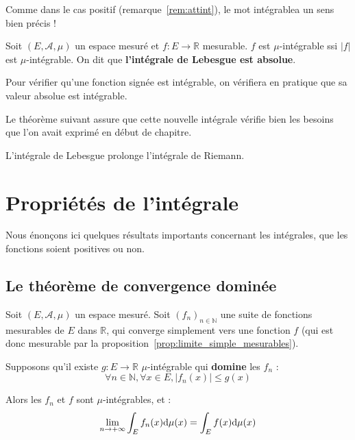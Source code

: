 \documentclass[../integ-proba.tex]{subfiles}
\begin{document}
  \begin{rem}
    Comme dans le cas positif (remarque~\ref{rem:attint}), le mot \og intégrable\fg a un sens bien précis !
  \end{rem}

  \begin{thm}
    Soit $\left(E, \mathcal{A}, \mu\right)$ un espace mesuré et $f:E\longrightarrow\mathbb{R}$ mesurable. $f$ est $\mu$-intégrable ssi $\left|f\right|$ est $\mu$-intégrable.
    On dit que \textbf{l'intégrale de Lebesgue est absolue}.
  \end{thm}

  \begin{rem}
    Pour vérifier qu'une fonction signée est intégrable, on vérifiera en pratique que sa valeur absolue est intégrable.
  \end{rem}

  Le théorème suivant assure que cette nouvelle intégrale vérifie bien les besoins que l'on avait exprimé en début de chapitre.

  \begin{thm}
    L'intégrale de Lebesgue prolonge l'intégrale de Riemann.
  \end{thm}

  \section{Propriétés de l'intégrale}

  Nous énonçons ici quelques résultats importants concernant les intégrales, que les fonctions soient positives ou non.

  \subsection{Le théorème de convergence dominée}

  \begin{thm}
    \label{thm:convergence_dominee}
    Soit $\left(E,\mathcal{A},\mu\right)$ un espace mesuré.
    Soit $\left(f_n\right)_{n \in \mathbb{N}}$ une suite de fonctions mesurables de $E$ dans $\mathbb{R}$, qui converge simplement vers une fonction $f$ (qui est donc mesurable par la proposition~\ref{prop:limite_simple_mesurables}).

    Supposons qu'il existe $g:E \longrightarrow \mathbb{R}$ $\mu$-intégrable qui \textbf{domine} les $f_n$ :
    \begin{displaymath}
      \forall n \in \mathbb{N}, \forall x \in E, \left|f_n(x)\right| \leq g(x)
    \end{displaymath}

    Alors les $f_n$ et $f$ sont $\mu$-intégrables, et :
    \begin{displaymath}
      \lim_{n \to + \infty} \int_E f_n(x) \textnormal{d}\mu(x) = \int_E f(x) \textnormal{d}\mu(x)
    \end{displaymath}
  \end{thm}
\end{document}
